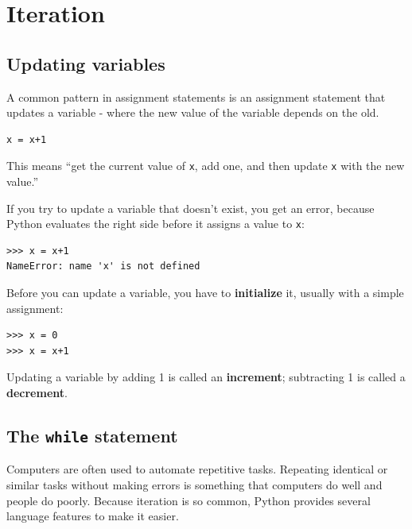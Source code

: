 \documentclass[10pt]{book}
\begin{document}
\chapter{Iteration}


\section{Updating variables}
\label{update}


A common pattern in assignment statements is an assignment statement
that updates a variable - 
where the new value of the variable depends on the old.

\beforeverb
\begin{verbatim}
x = x+1
\end{verbatim}
\afterverb
%
This means ``get the current value of {\tt x}, add one, and then
update {\tt x} with the new value.''

If you try to update a variable that doesn't exist, you get an
error, because Python evaluates the right side before it assigns
a value to {\tt x}:

\beforeverb
\begin{verbatim}
>>> x = x+1
NameError: name 'x' is not defined
\end{verbatim}
\afterverb
%
Before you can update a variable, you have to {\bf initialize}
it, usually with a simple assignment:


\beforeverb
\begin{verbatim}
>>> x = 0
>>> x = x+1
\end{verbatim}
\afterverb
%
Updating a variable by adding 1 is called an {\bf increment};
subtracting 1 is called a {\bf decrement}.


\section{The {\tt while} statement}


Computers are often used to automate repetitive tasks.  Repeating
identical or similar tasks without making errors is something that
computers do well and people do poorly.
Because iteration is so common, Python provides several
language features to make it easier.  
\end{document}
